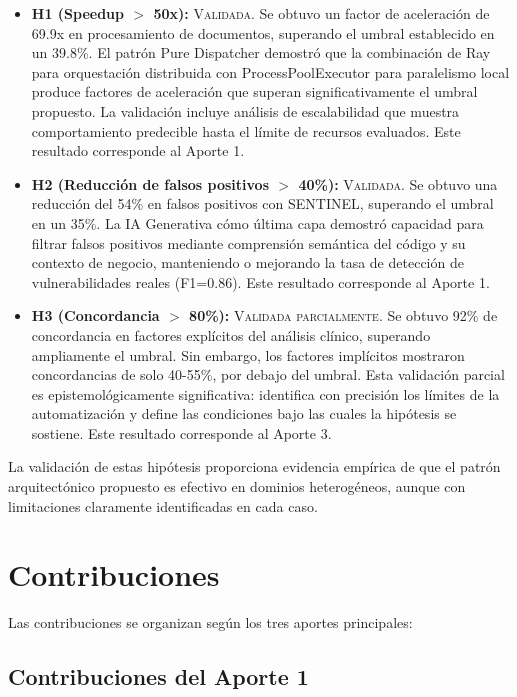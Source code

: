 \documentclass[12pt,a4paper,twoside]{book}
\begin{document}
\begin{itemize}
    \item \textbf{H1 (Speedup $>$ 50x):} \textsc{Validada}. Se obtuvo un factor de aceleración de 69.9x en procesamiento de documentos, superando el umbral establecido en un 39.8\%. El patrón Pure Dispatcher demostró que la combinación de Ray para orquestación distribuida con ProcessPoolExecutor para paralelismo local produce factores de aceleración que superan significativamente el umbral propuesto. La validación incluye análisis de escalabilidad que muestra comportamiento predecible hasta el límite de recursos evaluados. Este resultado corresponde al Aporte 1.
    
    \item \textbf{H2 (Reducción de falsos positivos $>$ 40\%):} \textsc{Validada}. Se obtuvo una reducción del 54\% en falsos positivos con SENTINEL, superando el umbral en un 35\%. La IA Generativa cómo última capa demostró capacidad para filtrar falsos positivos mediante comprensión semántica del código y su contexto de negocio, manteniendo o mejorando la tasa de detección de vulnerabilidades reales (F1=0.86). Este resultado corresponde al Aporte 1.
    
    \item \textbf{H3 (Concordancia $>$ 80\%):} \textsc{Validada parcialmente}. Se obtuvo 92\% de concordancia en factores explícitos del análisis clínico, superando ampliamente el umbral. Sin embargo, los factores implícitos mostraron concordancias de solo 40-55\%, por debajo del umbral. Esta validación parcial es epistemológicamente significativa: identifica con precisión los límites de la automatización y define las condiciones bajo las cuales la hipótesis se sostiene. Este resultado corresponde al Aporte 3.
\end{itemize}

La validación de estas hipótesis proporciona evidencia empírica de que el patrón arquitectónico propuesto es efectivo en dominios heterogéneos, aunque con limitaciones claramente identificadas en cada caso.

\section{Contribuciones}

Las contribuciones se organizan según los tres aportes principales:

\subsection{Contribuciones del Aporte 1}
\end{document}
